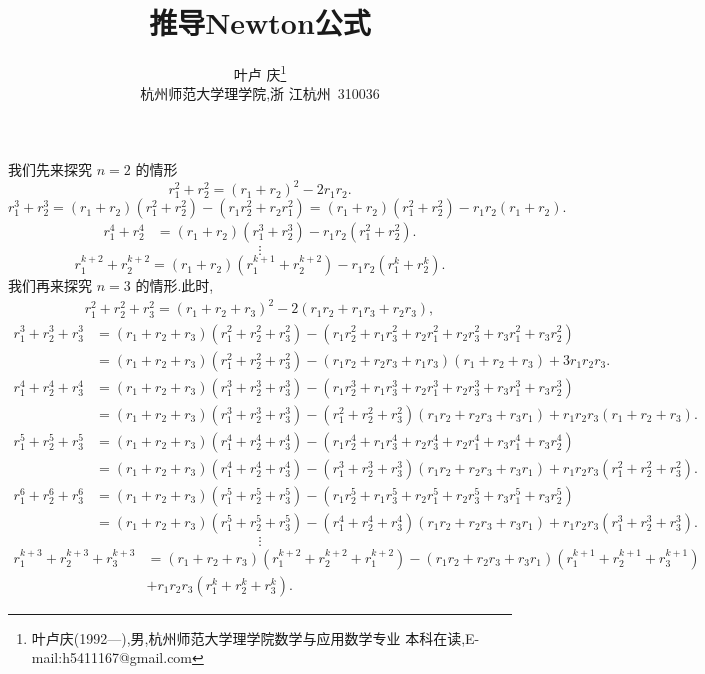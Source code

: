 \documentclass[twoside,11pt]{article} \usepackage{amsmath,amsfonts,bm}
\begin{document}
\title{\huge{\textbf{推导Newton公式}}} \author{\small{叶卢
    庆\footnote{叶卢庆(1992---),男,杭州师范大学理学院数学与应用数学专业
      本科在读,E-mail:h5411167@gmail.com}}\\{\small{杭州师范大学理学院,浙
      江杭州~310036}}} \date{}
\maketitle
我们先来探究 $n=2$ 的情形
$$
r_1^2+r_2^2=(r_{1}+r_{2})^{2}-2r_{1}r_{2}.
$$
$$
r_1^3+r_2^3=(r_1+r_2)(r_1^2+r_2^2)-(r_1r_2^2+r_2r_1^2)=(r_1+r_2)(r_1^{2}+r_{2}^{2})-r_1r_2(r_1+r_2).
$$
\begin{align*}
  r_1^4+r_2^4&=(r_1+r_2)(r_1^3+r_2^3)-r_1r_2(r_1^2+r_2^2).
\end{align*}
$$
\vdots
$$
$$
r_1^{k+2}+r_2^{k+2}=(r_1+r_2)(r_1^{k+1}+r_2^{k+2})-r_1r_2(r_1^k+r_2^k).
$$
我们再来探究 $n=3$ 的情形.此时,
\begin{align*}
  r_1^2+r_2^2+r_3^2=(r_1+r_2+r_3)^2-2(r_1r_2+r_1r_3+r_2r_3),
\end{align*}
\begin{align*}
  r_1^3+r_2^3+r_3^3&=(r_1+r_2+r_3)(r_1^{2}+r_2^2+r_3^2)-(r_1r_2^2+r_1r_3^2+r_2r_1^2+r_2r_3^2+r_3r_1^2+r_3r_2^2)\\&=(r_1+r_2+r_3)(r_1^2+r_2^2+r_3^2)-(r_1r_2+r_2r_3+r_1r_3)(r_1+r_2+r_3)+3r_1r_2r_3.
\end{align*}
\begin{align*}
  r_1^4+r_2^4+r_3^4&=(r_1+r_2+r_3)(r_1^3+r_2^3+r_3^3)-(r_1r_2^3+r_1r_3^3+r_2r_1^3+r_2r_3^3+r_3r_1^3+r_3r_2^3)\\&=(r_1+r_2+r_3)(r_1^3+r_2^3+r_3^3)-(r_1^2+r_2^2+r_3^2)(r_1r_2+r_2r_3+r_3r_1)+r_1r_2r_3(r_1+r_2+r_3).
\end{align*}
\begin{align*}
  r_1^5+r_2^5+r_3^5&=(r_1+r_2+r_3)(r_1^{4}+r_2^4+r_3^4)-(r_1r_2^4+r_1r_3^4+r_2r_3^4+r_2r_1^4+r_3r_1^4+r_3r_2^4)\\&=(r_1+r_2+r_3)(r_1^4+r_{2}^4+r_3^4)-(r_1^3+r_2^3+r_3^3)(r_1r_2+r_2r_3+r_3r_1)+r_1r_2r_3(r_1^2+r_2^2+r_3^2).
\end{align*}
\begin{align*}
  r_1^6+r_2^6+r_3^6&=(r_1+r_2+r_3)(r_1^5+r_2^5+r_3^5)-(r_1r_2^5+r_1r_3^5+r_2r_1^5+r_2r_3^5+r_3r_1^5+r_3r_2^5)\\&=(r_1+r_2+r_3)(r_1^5+r_2^5+r_3^5)-(r_1^4+r_2^4+r_3^4)(r_1r_2+r_2r_3+r_3r_1)+r_1r_2r_3(r_1^3+r_2^3+r_3^3).
\end{align*}
$$
\vdots
$$
\begin{align*}
  r_1^{k+3}+r_2^{k+3}+r_3^{k+3}&=(r_1+r_2+r_3)(r_1^{k+2}+r_2^{k+2}+r_1^{k+2})-(r_1r_2+r_2r_3+r_3r_1)(r_1^{k+1}+r_2^{k+1}+r_3^{k+1})\\&+r_1r_2r_3(r_1^k+r_2^k+r_3^k).
\end{align*}
\end{document}
